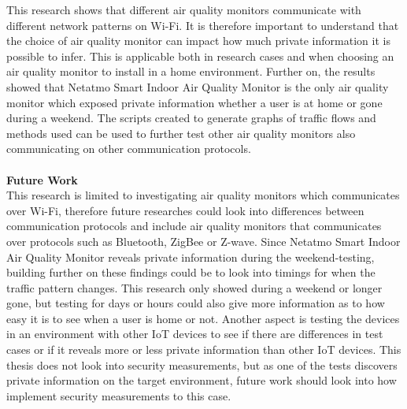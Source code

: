 This research shows that different air quality monitors communicate with different network patterns on \gls{Wi-Fi}. It is therefore important to understand that the choice of air quality monitor can impact how much private information it is possible to infer. This is applicable both in research cases and when choosing an air quality monitor to install in a home environment. Further on, the results showed that Netatmo Smart Indoor Air Quality Monitor is the only air quality monitor which exposed private information whether a user is at home or gone during a weekend. The scripts created to generate graphs of traffic flows and methods used can be used to further test other air quality monitors also communicating on other communication protocols.
\\\\
\textbf{Future Work}
\\
This research is limited to investigating air quality monitors which communicates over \gls{Wi-Fi}, therefore future researches could look into differences between communication protocols and include air quality monitors that communicates over protocols such as Bluetooth, ZigBee or Z-wave. Since Netatmo Smart Indoor Air Quality Monitor reveals private information during the weekend-testing, building further on these findings could be to look into timings for when the traffic pattern changes. This research only showed during a weekend or longer gone, but testing for days or hours could also give more information as to how easy it is to see when a user is home or not. Another aspect is testing the devices in an environment with other \gls{IoT} devices to see if there are differences in test cases or if it reveals more or less private information than other \gls{IoT} devices. This thesis does not look into security measurements, but as one of the tests discovers private information on the target environment, future work should look into how implement security measurements to this case. 
